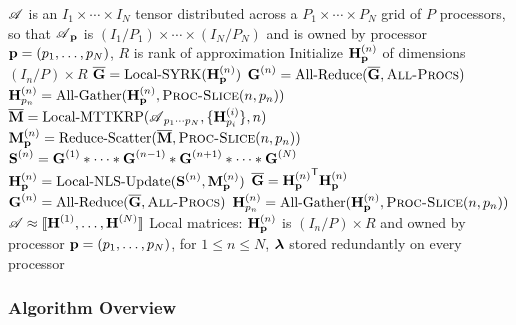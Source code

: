 \begin{algorithm}
\caption{$\CP = \text{Par-NNCP}(\TA,R)$}
\label{alg:Par-NNCP-short}
\begin{algorithmic}[1]
\Require $\TA$ is an $I_1\times \cdots \times I_N$ tensor distributed across a $P_1\times \cdots \times P_N$ grid of $P$ processors, so that $\TA_{\V{p}}$ is $(I_1/P_1)\times \cdots \times (I_N/P_N)$ and is owned by processor $\V{p}=(p_1,\dots,p_N)$, $R$ is rank of approximation
	\State Initialize $\Mn{H}{n}_{\V{p}}$ of dimensions $(I_n/P)\times R$ 
	\State $\M[\overline]{G} = \text{Local-SYRK}(\Mn{H}{n}_{\V{p}})$
	\State $\Mn{G}{n} = \text{All-Reduce}(\M[\overline]{G},\textsc{All-Procs})$
	\State $\Mn{H}{n}_{p_n} = \text{All-Gather}(\Mn{H}{n}_{\V{p}},\textsc{Proc-Slice}(n,\VE{p}{n}))$
\EndFor
\State {}
	\label{line:while}
	\State {}
		\label{line:for}
		\State {}
		\State $\M[\overline]{M} = \text{Local-MTTKRP}(\TA_{p_1\cdots p_N},\{\Mn{H}{i}_{p_i}\},n)$
			\label{line:locMTTKRP}
		\State $\Mn{M}{n}_{\V{p}} = \text{Reduce-Scatter}(\M[\overline]{M},\textsc{Proc-Slice}(n,\VE{p}{n}))$ 
			\label{line:reduce-scatter}
		\State $\Mn{S}{n} = \Mn{G}{1} \Hada \cdots \Hada \Mn{G}{n-1} \Hada \Mn{G}{n+1} \Hada \cdots \Hada \Mn{G}{N}$
			\label{line:hadamard}
		\State $\Mn{H}{n}_{\V{p}} = \text{Local-NLS-Update}(\Mn{S}{n},\Mn{M}{n}_{\V{p}})$
			\label{line:locNLS}
		\State {}
		\State $\M[\overline]{G} = {\Mn{H}{n}_{\V{p}}}^\Tra\Mn{H}{n}_{\V{p}}$
			\label{line:locSYRK}
		\State $\Mn{G}{n} = \text{All-Reduce}(\M[\overline]{G},\textsc{All-Procs})$
			\label{line:all-reduce}
		\State $\Mn{H}{n}_{p_n} = \text{All-Gather}(\Mn{H}{n}_{\V{p}},\textsc{Proc-Slice}(n,\VE{p}{n}))$
			\label{line:all-gather}
	\EndFor 
		\label{line:endfor}
\EndWhile
	\label{line:endwhile}
\Ensure $\TA \approx \CP$
\Ensure Local matrices: $\Mn{H}{n}_{\V{p}}$ is $(I_n/P)\times R$ and owned by processor $\V{p}=(p_1,\dots,p_N)$, for $1\leq n \leq N$, $\V{\lambda}$ stored redundantly on every processor
\end{algorithmic}
\end{algorithm}

\subsubsection{Algorithm Overview}

